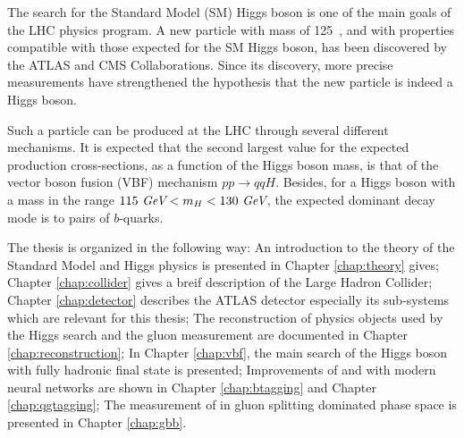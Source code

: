 The search for the Standard Model (SM) Higgs boson\cite{Englert:1964et,Higgs:1964pj,Higgs:1964ia,Guralnik:1964eu}  is one of the main goals of the LHC physics program.  A new particle with mass of 125~\gev, and with  properties  compatible with those expected for the SM Higgs boson, has been discovered by the ATLAS\cite{HIGG-2012-27} and CMS\cite{CMS-HIG-12-028} Collaborations. Since its discovery, more precise measurements have strengthened the hypothesis that the new particle is indeed a Higgs boson\cite{HIGG-2013-02,HIGG-2014-06,HIGG-2014-14,CMS-HIG-12-036,CMS-HIG-12-041}.

Such a particle can be produced at the LHC through several different mechanisms. It is expected that the second largest value for the expected production cross-sections\cite{Dittmaier:2011ti}, as a function of the Higgs boson mass, is that of the vector boson fusion (VBF) mechanism $pp\to qqH$. Besides, for a Higgs boson with a mass in the range $115~\textit{GeV} < m_{H} < 130~\textit{GeV}$, the expected dominant decay mode is to pairs of $b$-quarks.

The thesis is organized in the following way: An introduction to the theory of the Standard Model and Higgs physics is presented in Chapter \ref{chap:theory} gives; Chapter \ref{chap:collider} gives a breif description of the Large Hadron Collider; Chapter \ref{chap:detector} describes the ATLAS detector especially its sub-systems which are relevant for this thesis; The reconstruction of physics objects used by the Higgs search and the gluon measurement are documented in Chapter \ref{chap:reconstruction}; In Chapter \ref{chap:vbf}, the main search of the Higgs boson with fully hadronic final state is presented; Improvements of \btagging and \qgtagging with modern neural networks are shown in Chapter \ref{chap:btagging} and Chapter \ref{chap:qgtagging}; The measurement of \gbb in gluon splitting dominated phase space is presented in Chapter \ref{chap:gbb}.
